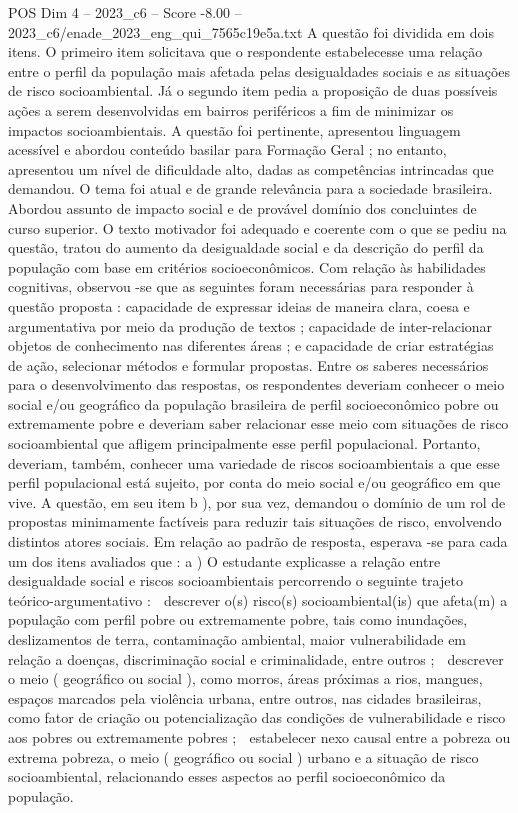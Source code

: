 \begin{textsample}{POS Dim 4 – 2023\_c6 – Score -8.00 – 2023\_c6/enade\_2023\_eng\_qui\_7565c19e5a.txt}
A questão foi dividida em dois itens.
O primeiro item solicitava que o respondente estabelecesse uma relação entre o perfil da população mais afetada pelas desigualdades sociais e as situações de risco socioambiental.
Já o segundo item pedia a proposição de duas possíveis ações a serem desenvolvidas em bairros periféricos a fim de minimizar os impactos socioambientais.
A questão foi pertinente, apresentou linguagem acessível e abordou conteúdo basilar para Formação Geral ; no entanto, apresentou um nível de dificuldade alto, dadas as competências intrincadas que demandou.
O tema foi atual e de grande relevância para a sociedade brasileira.
Abordou assunto de impacto social e de provável domínio dos concluintes de curso superior.
O texto motivador foi adequado e coerente com o que se pediu na questão, tratou do aumento da desigualdade social e da descrição do perfil da população com base em critérios socioeconômicos.
Com relação às habilidades cognitivas, observou -se que as seguintes foram necessárias para responder à questão proposta : capacidade de expressar ideias de maneira clara, coesa e argumentativa por meio da produção de textos ; capacidade de inter-relacionar objetos de conhecimento nas diferentes áreas ; e capacidade de criar estratégias de ação, selecionar métodos e formular propostas.
Entre os saberes necessários para o desenvolvimento das respostas, os respondentes deveriam conhecer o meio social e/ou geográfico da população brasileira de perfil socioeconômico pobre ou extremamente pobre e deveriam saber relacionar esse meio com situações de risco socioambiental que afligem principalmente esse perfil populacional.
Portanto, deveriam, também, conhecer uma variedade de riscos socioambientais a que esse perfil populacional está sujeito, por conta do meio social e/ou geográfico em que vive.
A questão, em seu item b ), por sua vez, demandou o domínio de um rol de propostas minimamente factíveis para reduzir tais situações de risco, envolvendo distintos atores sociais.
Em relação ao padrão de resposta, esperava -se para cada um dos itens avaliados que : a ) O estudante explicasse a relação entre desigualdade social e riscos socioambientais percorrendo o seguinte trajeto teórico-argumentativo :  descrever o(s) risco(s) socioambiental(is) que afeta(m) a população com perfil pobre ou extremamente pobre, tais como inundações, deslizamentos de terra, contaminação ambiental, maior vulnerabilidade em relação a doenças, discriminação social e criminalidade, entre outros ;  descrever o meio ( geográfico ou social ), como morros, áreas próximas a rios, mangues, espaços marcados pela violência urbana, entre outros, nas cidades brasileiras, como fator de criação ou potencialização das condições de vulnerabilidade e risco aos pobres ou extremamente pobres ;  estabelecer nexo causal entre a pobreza ou extrema pobreza, o meio ( geográfico ou social ) urbano e a situação de risco socioambiental, relacionando esses aspectos ao perfil socioeconômico da população.

\end{textsample}
